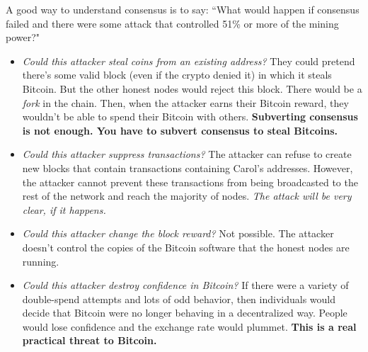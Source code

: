 \documentclass[12pt]{article}
\begin{document}
A good way to understand consensus is to say: ``What would happen if consensus failed and there were some attack that controlled 51\% or more of the mining power?"

\begin{itemize}
\item \textit{Could this attacker steal coins from an existing address?} They could pretend there's some valid block (even if the crypto denied it) in which it steals Bitcoin. But the other honest nodes would reject this block. There would be a \textit{fork} in the chain. Then, when the attacker earns their Bitcoin reward, they wouldn't be able to spend their Bitcoin with others. \textbf{Subverting consensus is not enough. You have to subvert consensus to steal Bitcoins.}
\item \textit{Could this attacker suppress transactions?} The attacker can refuse to create new blocks that contain transactions containing Carol's addresses. However, the attacker cannot prevent these transactions from being broadcasted to the rest of the network and reach the majority of nodes. \textit{The attack will be very clear, if it happens.}
\item \textit{Could this attacker change the block reward?} Not possible. The attacker doesn't control the copies of the Bitcoin software that the honest nodes are running.
\item \textit{Could this attacker destroy confidence in Bitcoin?} If there were a variety of double-spend attempts and lots of odd behavior, then individuals would decide that Bitcoin were no longer behaving in a decentralized way. People would lose confidence and the exchange rate would plummet. \textbf{This is a real practical threat to Bitcoin.}
\end{itemize}
\end{document}
